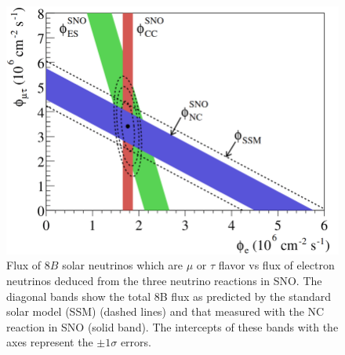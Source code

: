 \begin{figure}[t]
    \centering
    \includegraphics[width=0.7\linewidth]{figures/ch2-Theory/SNO.png}
    \caption[Evidence of solar neutrino oscillations from the SNO experiment]{Flux of $8B$ solar neutrinos which are $\mu$ or $\tau$ flavor vs flux of electron neutrinos deduced from the three neutrino reactions in SNO. The diagonal bands show the total 8B flux as predicted by the standard solar model (SSM) (dashed lines) and that measured with the NC reaction in SNO (solid band). The intercepts of these bands with the axes represent the $\pm 1 \sigma$ errors. \cite{SNO:2002tuh}}
    \label{fig:SNO}
\end{figure}

